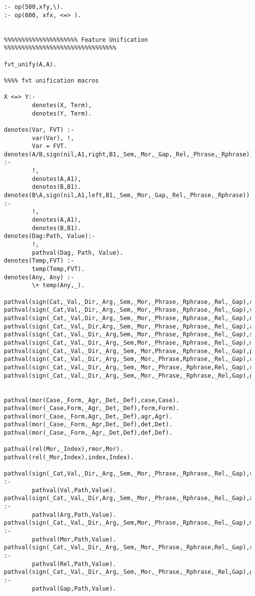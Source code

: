 \begin{verbatim}
:- op(500,xfy,\).
:- op(600, xfx, <=> ).


%%%%%%%%%%%%%%%%%%%%% Feature Unification %%%%%%%%%%%%%%%%%%%%%%%%%%%%%%%%

fvt_unify(A,A).

%%%% fvt unification macros

X <=> Y:- 
        denotes(X, Term), 
        denotes(Y, Term).

denotes(Var, FVT) :- 
        var(Var), !, 
        Var = FVT.
denotes(A/B,sign(nil,A1,right,B1,_Sem,_Mor,_Gap,_Rel,_Phrase,_Rphrase)) :-
        !,
        denotes(A,A1),
        denotes(B,B1).
denotes(B\A,sign(nil,A1,left,B1,_Sem,_Mor,_Gap,_Rel,_Phrase,_Rphrase)) :-
        !,
        denotes(A,A1),
        denotes(B,B1).
denotes(Dag:Path, Value):-
        !,
        pathval(Dag, Path, Value).       
denotes(Temp,FVT) :- 
        temp(Temp,FVT).
denotes(Any, Any) :- 
        \+ temp(Any,_).
        
pathval(sign(Cat,_Val,_Dir,_Arg,_Sem,_Mor,_Phrase,_Rphrase,_Rel,_Gap),cat,Cat).
pathval(sign(_Cat,Val,_Dir,_Arg,_Sem,_Mor,_Phrase,_Rphrase,_Rel,_Gap),val,Val).
pathval(sign(_Cat,_Val,Dir,_Arg,_Sem,_Mor,_Phrase,_Rphrase,_Rel,_Gap),dir,Dir).
pathval(sign(_Cat,_Val,_Dir,Arg,_Sem,_Mor,_Phrase,_Rphrase,_Rel,_Gap),arg,Arg).
pathval(sign(_Cat,_Val,_Dir,_Arg,Sem,_Mor,_Phrase,_Rphrase,_Rel,_Gap),sem,Sem).
pathval(sign(_Cat,_Val,_Dir,_Arg,_Sem,Mor,_Phrase,_Rphrase,_Rel,_Gap),mor,Mor).
pathval(sign(_Cat,_Val,_Dir,_Arg,_Sem,_Mor,Phrase,_Rphrase,_Rel,_Gap),phrase,Phrase).
pathval(sign(_Cat,_Val,_Dir,_Arg,_Sem,_Mor,_Phrase,Rphrase,_Rel,_Gap),rphrase,Rphrase).
pathval(sign(_Cat,_Val,_Dir,_Arg,_Sem,_Mor,_Phrase,_Rphrase,Rel,_Gap),rel,Rel).
pathval(sign(_Cat,_Val,_Dir,_Arg,_Sem,_Mor,_Phrase,_Rphrase,_Rel,Gap),gap,Gap).


pathval(mor(Case,_Form,_Agr,_Det,_Def),case,Case).
pathval(mor(_Case,Form,_Agr,_Det,_Def),form,Form).
pathval(mor(_Case,_Form,Agr,_Det,_Def),agr,Agr).
pathval(mor(_Case,_Form,_Agr,Det,_Def),det,Det).
pathval(mor(_Case,_Form,_Agr,_Det,Def),def,Def).

pathval(rel(Mor,_Index),rmor,Mor).
pathval(rel(_Mor,Index),index,Index).

pathval(sign(_Cat,Val,_Dir,_Arg,_Sem,_Mor,_Phrase,_Rphrase,_Rel,_Gap),val:Path,Value) :-
        pathval(Val,Path,Value).
pathval(sign(_Cat,_Val,_Dir,Arg,_Sem,_Mor,_Phrase,_Rphrase,_Rel,_Gap),arg:Path,Value) :-
        pathval(Arg,Path,Value).
pathval(sign(_Cat,_Val,_Dir,_Arg,_Sem,Mor,_Phrase,_Rphrase,_Rel,_Gap),mor:Path,Value) :-
        pathval(Mor,Path,Value).
pathval(sign(_Cat,_Val,_Dir,_Arg,_Sem,_Mor,_Phrase,_Rphrase,Rel,_Gap),rel:Path,Value) :-
        pathval(Rel,Path,Value).
pathval(sign(_Cat,_Val,_Dir,_Arg,_Sem,_Mor,_Phrase,_Rphrase,_Rel,Gap),gap:Path,Value) :-
        pathval(Gap,Path,Value).


\end{verbatim}
